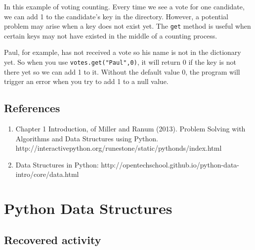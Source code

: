 \documentclass[
  letterpaper,
]{scrbook}
\providecommand{\tightlist}{%
  \setlength{\itemsep}{0pt}\setlength{\parskip}{0pt}}
\begin{document}
In this example of voting counting. Every time we see a vote for one
candidate, we can add 1 to the candidate's key in the directory.
However, a potential problem may arise when a key does not exist yet.
The \texttt{get} method is useful when certain keys may not have existed
in the middle of a counting process.

Paul, for example, has not received a vote so his name is not in the
dictionary yet. So when you use \texttt{votes.get("Paul",0)}, it will
return 0 if the key is not there yet so we can add 1 to it. Without the
default value 0, the program will trigger an error when you try to add 1
to a null value.

\section*{References}\label{references-1}


\begin{enumerate}
\def\labelenumi{\arabic{enumi}.}
\tightlist
\item
  Chapter 1 Introduction, of Miller and Ranum (2013). Problem Solving
  with Algorithms and Data Structures using Python.
  http://interactivepython.org/runestone/static/pythonds/index.html
\item
  Data Structures in Python:
  http://opentechschool.github.io/python-data-intro/core/data.html
\end{enumerate}

\chapter*{Python Data Structures}\label{ch-lab-python-data-structures}


\section*{Recovered activity}\label{sec-lab-python-data-structures}

\end{document}
